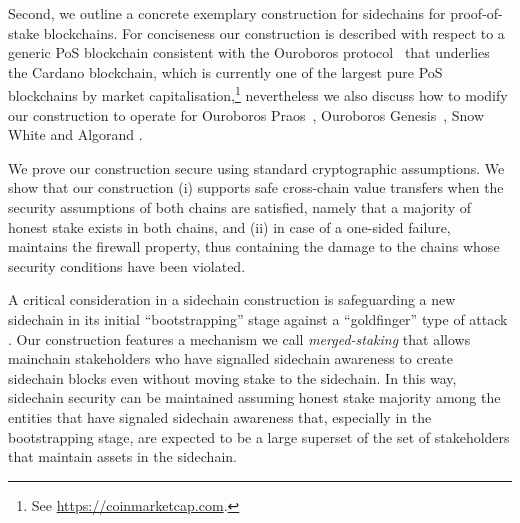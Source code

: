 Second, we  outline a concrete exemplary
construction for sidechains for proof-of-stake
blockchains. For conciseness our construction is described
with respect to a generic PoS blockchain consistent with the  Ouroboros
protocol~\cite{C:KRDO17} that underlies the Cardano blockchain, which is currently one of the largest
pure PoS blockchains by market capitalisation,\footnote{See \url{https://coinmarketcap.com}. }
nevertheless we also discuss how to modify our construction to
operate for
Ouroboros Praos~\cite{EC:DGKR18},
Ouroboros Genesis~\cite{genesis},
Snow White \cite{DBLP:journals/iacr/BentovPS16a}
and
Algorand \cite{algorand}.

We prove our construction secure   using standard cryptographic
assumptions. We show that our construction (i) supports safe cross-chain value
transfers when the security assumptions of both chains are satisfied, namely
that a majority of honest stake exists in both chains, and (ii) in case of a
one-sided failure,  maintains the firewall property, thus
containing the damage
to the chains whose security conditions have been violated.
%

A critical consideration in a sidechain construction is safeguarding
a new sidechain in its initial ``bootstrapping'' stage against a ``goldfinger'' type of attack \cite{Kroll:2013sp}. Our construction
features a mechanism we call {\em merged-staking}
that allows  mainchain stakeholders who have signalled
sidechain awareness to create sidechain blocks even without moving stake
to the sidechain. In this way, sidechain security can be maintained
assuming honest stake majority among the entities that have signaled sidechain
awareness that, especially in the bootstrapping stage, are expected to be
a large superset of the set of stakeholders that maintain assets
in the sidechain.


